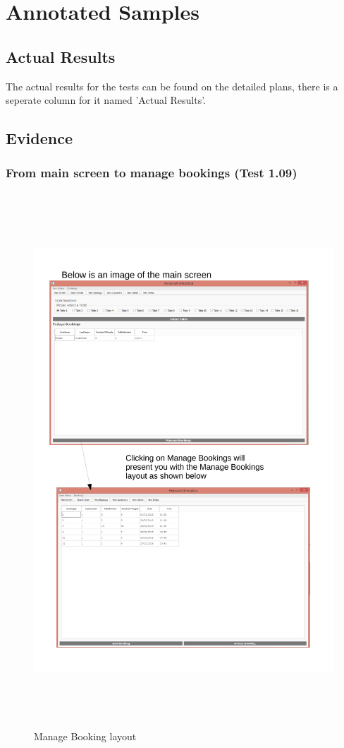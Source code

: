 \section{Annotated Samples}

\subsection{Actual Results}
The actual results for the tests can be found on the detailed plans, there is a seperate column for it named 'Actual Results'.

\subsection{Evidence}

\subsubsection{From main screen to manage bookings (Test 1.09)}

\begin{figure}[H]
    \includegraphics[height = 20cm]{./Testing/images/test1}
    \caption{Manage Booking layout} \label{fig:Test1}
\end{figure}

